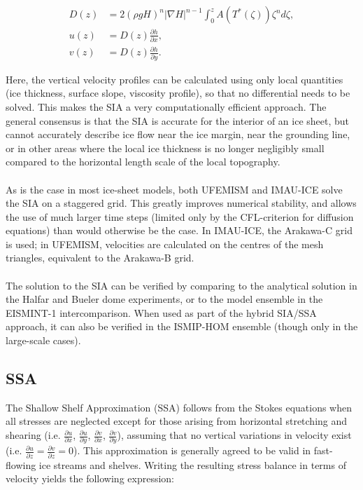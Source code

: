\documentclass{article}
\begin{document}
\begin{align} \label{eq:SIA_01}
D(z) &= 2 {\left( \rho g H \right)}^n {\left| \nabla H \right|}^{n-1} \int_0^z A \left( T^{\ast} \left( \zeta \right) \right) \zeta^n d\zeta, \\
u(z) &= D(z) \frac{\partial h}{\partial x}, \\
v(z) &= D(z) \frac{\partial h}{\partial y}.
\end{align}

Here, the vertical velocity profiles can be calculated using only local quantities (ice thickness, surface slope, viscosity profile), so that no differential needs to be solved. This makes the SIA a very computationally efficient approach. The general consensus is that the SIA is accurate for the interior of an ice sheet, but cannot accurately describe ice flow near the ice margin, near the grounding line, or in other areas where the local ice thickness is no longer negligibly small compared to the horizontal length scale of the local topography.\\
\\
As is the case in most ice-sheet models, both UFEMISM and IMAU-ICE solve the SIA on a staggered grid. This greatly improves numerical stability, and allows the use of much larger time steps (limited only by the CFL-criterion for diffusion equations) than would otherwise be the case. In IMAU-ICE, the Arakawa-C grid is used; in UFEMISM, velocities are calculated on the centres of the mesh triangles, equivalent to the Arakawa-B grid.\\
\\
The solution to the SIA can be verified by comparing to the analytical solution in the Halfar and Bueler dome experiments, or to the model ensemble in the EISMINT-1 intercomparison. When used as part of the hybrid SIA/SSA approach, it can also be verified in the ISMIP-HOM ensemble (though only in the large-scale cases).

\subsection{SSA}

The Shallow Shelf Approximation (SSA) follows from the Stokes equations when all stresses are neglected except for those arising from horizontal stretching and shearing (i.e. $\frac{\partial u}{\partial x}$, $\frac{\partial u}{\partial y}$, $\frac{\partial v}{\partial x}$, $\frac{\partial v}{\partial y}$), assuming that no vertical variations in velocity exist (i.e. $\frac{\partial u}{\partial z} = \frac{\partial v}{\partial z} = 0$). This approximation is generally agreed to be valid in fast-flowing ice streams and shelves. Writing the resulting stress balance in terms of velocity yields the following expression:
\end{document}
